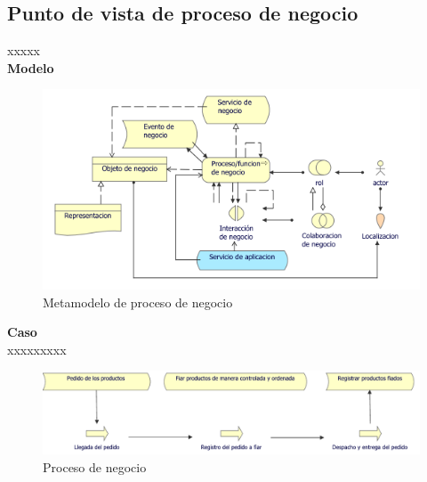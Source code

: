 	\subsection{Punto de vista de proceso de negocio}
	{ xxxxx\\
		
		\textbf{Modelo}\\
		\begin{figure}[H]
			\centering
			\includegraphics[width=0.8\linewidth]{development/proceso.png}
			\caption{Metamodelo de proceso de negocio}
		\end{figure}
		
		\textbf{Caso}\\
		xxxxxxxxx\\
		
		\begin{figure}[H]
			\centering
			\includegraphics[width=0.8\linewidth]{development/proceso.pdf}
			\caption{Proceso de negocio}
		\end{figure}
	}
	
